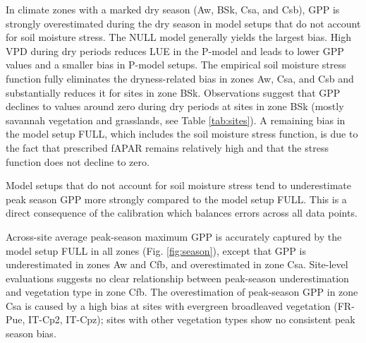 \documentclass[gmd, manuscript]{copernicus}
\begin{document}
In climate zones with a marked dry season (Aw, BSk, Csa, and Csb), GPP is strongly overestimated during the dry season in model setups that do not account for soil moisture stress. The NULL model generally yields the largest bias. High VPD during dry periods reduces LUE in the P-model and leads to lower GPP values and a smaller bias in P-model setups. The empirical soil moisture stress function fully eliminates the dryness-related bias in zones Aw, Csa, and Csb and substantially reduces it for sites in zone BSk. Observations suggest that GPP declines to values around zero during dry periods at sites in zone BSk (mostly savannah vegetation and grasslands, see Table \ref{tab:sites}). A remaining bias in the model setup FULL, which includes the soil moisture stress function, is due to the fact that prescribed fAPAR remains relatively high and that the stress function does not decline to zero.

Model setups that do not account for soil moisture stress tend to underestimate peak season GPP more strongly compared to the model setup FULL. This is a direct consequence of the calibration which balances errors across all data points.

Across-site average peak-season maximum GPP is accurately captured by the model setup FULL in all zones (Fig. \ref{fig:season}), except that GPP is underestimated in zones Aw and Cfb, and overestimated in zone Csa. Site-level evaluations suggests no clear relationship between peak-season underestimation and vegetation type in zone Cfb. The overestimation of peak-season GPP in zone Csa is caused by a high bias at sites with evergreen broadleaved vegetation (FR-Pue, IT-Cp2, IT-Cpz); sites with other vegetation types show no consistent peak season bias. 
\end{document}
